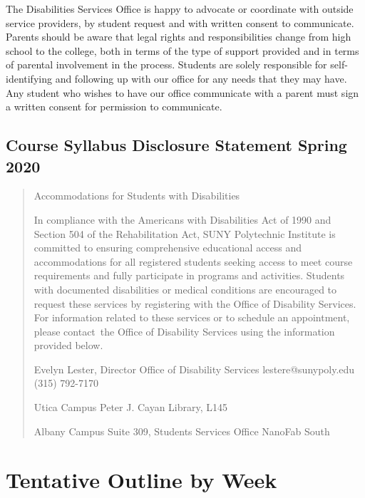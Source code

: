 \documentclass[11pt]{article}
\begin{document}
The Disabilities Services Office is happy to advocate or coordinate with outside service providers, by student request and with written consent to communicate. Parents should be aware that legal rights and responsibilities change from high school to the college, both in terms of the type of support provided and in terms of parental involvement in the process. Students are solely responsible for self-identifying and following up with our office for any needs that they may have. Any student who wishes to have our office communicate with a parent must sign a written consent for permission to communicate.

\subsection{Course Syllabus Disclosure Statement Spring 2020}
\label{sec:org25f9a50}

\begin{quote}
Accommodations for Students with Disabilities

In compliance with the Americans with Disabilities Act of 1990 and Section 504 of the Rehabilitation Act, SUNY Polytechnic Institute is committed to ensuring comprehensive educational access and accommodations for all registered students seeking access to meet course requirements and fully participate in programs and activities.  Students with documented disabilities or medical conditions are encouraged to request these services by registering with the Office of Disability Services.  For information related to these services or to schedule an appointment, please contact the Office of Disability Services using the information provided below.

Evelyn Lester, Director
Office of Disability Services
lestere@sunypoly.edu
(315) 792-7170

Utica Campus
Peter J. Cayan Library, L145

Albany Campus
Suite 309, Students Services Office
NanoFab South
\end{quote}

\section{Tentative Outline by Week}
\label{sec:org7937f77}
\end{document}
